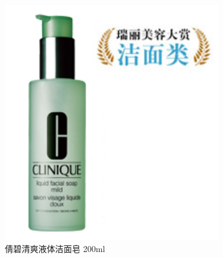 \begin{figure}[htbp]
\begin{minipage}{.5\linewidth}
\centering\includegraphics[width=.8\linewidth]{figures/hua-2.png}
\caption{倩碧清爽液体洁面皂 200ml}
\end{minipage}
\begin{minipage}{.5\linewidth}

\end{minipage}
\end{figure}
